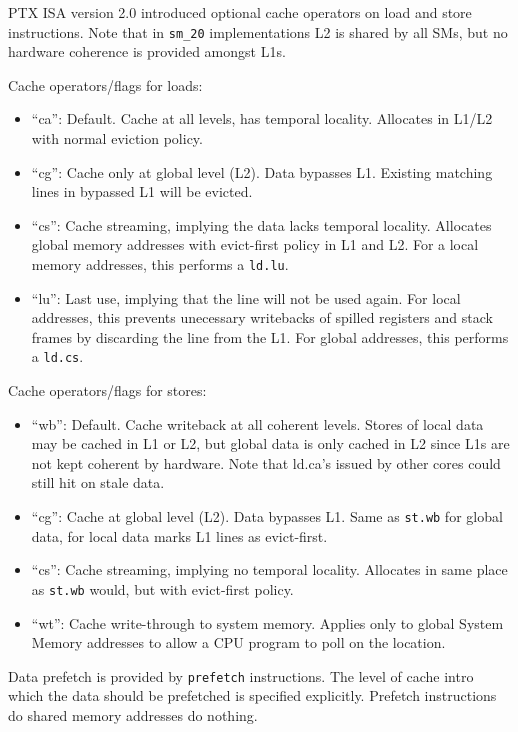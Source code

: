 PTX ISA version 2.0 introduced optional cache operators on load and store instructions. Note that in \verb=sm_20= implementations L2 is shared by all SMs, but no hardware coherence is provided amongst L1s.

Cache operators/flags for loads:
\begin{itemize}
\item ``ca'':  Default. Cache at all levels, has temporal locality. Allocates in L1/L2 with normal eviction policy.
\item ``cg'': Cache only at global level (L2). Data bypasses L1. Existing matching lines in bypassed L1 will be evicted.
\item ``cs'': Cache streaming, implying the data lacks temporal locality. Allocates global memory addresses with evict-first policy in L1 and L2. For a local memory addresses, this performs a \verb=ld.lu=.
\item ``lu'': Last use, implying that the line will not be used again. For local addresses, this prevents unecessary writebacks of spilled registers and stack frames by discarding the line from the L1. For global addresses, this performs a \verb=ld.cs=.
\end{itemize}

Cache operators/flags for stores:
\begin{itemize}
\item ``wb'': Default. Cache writeback at all coherent levels. Stores of local data may be cached in L1 or L2, but global data is only cached in L2 since L1s are not kept coherent by hardware. Note that ld.ca's issued by other cores could still hit on stale data.
\item ``cg'': Cache at global level (L2). Data bypasses L1. Same as \verb=st.wb= for global data, for local data marks L1 lines as evict-first.
\item ``cs'': Cache streaming, implying no temporal locality. Allocates in same place as \verb=st.wb= would, but with evict-first policy.
\item ``wt'': Cache write-through to system memory. Applies only to global System Memory addresses to allow a CPU program to poll on the location.
\end{itemize}

Data prefetch is provided by \verb=prefetch= instructions. The level of cache intro which the data should be prefetched is specified explicitly. Prefetch instructions do shared memory addresses do nothing.

